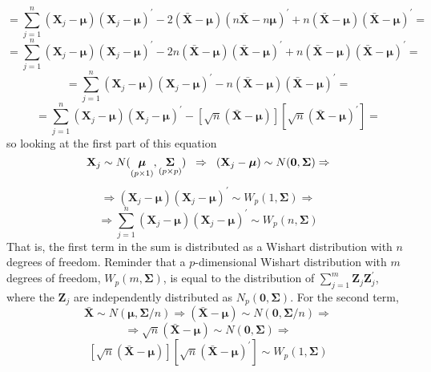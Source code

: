 \documentclass{article}
\begin{document}
    \[
        =
        \scriptstyle{
        \sum_{j=1}^{n}{
            (\textbf{X}_{j} - \bm{\mu}){(\textbf{X}_{j} - \bm{\mu})}^{\prime}
        }
        -
        2
        (\bar{\textbf{X}} - \bm{\mu})
        {(n\bar{\textbf{X}} - n\bm{\mu})}^{\prime}
        +
        n
        (\bar{\textbf{X}} - \bm{\mu}){(\bar{\textbf{X}} - \bm{\mu})}^{\prime}
        }
        =
    \]
    \[
        =
        \scriptstyle{
        \sum_{j=1}^{n}{
            (\textbf{X}_{j} - \bm{\mu}){(\textbf{X}_{j} - \bm{\mu})}^{\prime}
        }
        -
        2n
        (\bar{\textbf{X}} - \bm{\mu})
        {(\bar{\textbf{X}} - \bm{\mu})}^{\prime}
        +
        n
        (\bar{\textbf{X}} - \bm{\mu}){(\bar{\textbf{X}} - \bm{\mu})}^{\prime}
        }
        =
    \]
    \[
        =
        \sum_{j=1}^{n}{
            (\textbf{X}_{j} - \bm{\mu}){(\textbf{X}_{j} - \bm{\mu})}^{\prime}
        }
        -
        n
        (\bar{\textbf{X}} - \bm{\mu})
        {(\bar{\textbf{X}} - \bm{\mu})}^{\prime}
        =
    \]
    \[
        =
        \sum_{j=1}^{n}{
            (\textbf{X}_{j} - \bm{\mu}){(\textbf{X}_{j} - \bm{\mu})}^{\prime}
        }
        -
        \left[
            \sqrt{n}
            (\bar{\textbf{X}} - \bm{\mu})
        \right]
        \left[
            \sqrt{n}
            {(\bar{\textbf{X}} - \bm{\mu})}^{\prime}
        \right]
        =
    \]
    so looking at the first part of this equation
    \[
        \textbf{X}_{j}
        \sim
        N(\underset{(p \times 1)}{\bm{\mu}}, \underset{(p \times p)}{\bm{\Sigma}})
        \hspace{0.2cm}
        \Rightarrow
        \hspace{0.2cm}
        (\textbf{X}_{j} - \bm{\mu})
        \sim
        N(\textbf{0}, \bm{\Sigma})
        \Rightarrow
    \]
    \[
        \Rightarrow
        (\textbf{X}_{j} - \bm{\mu}){(\textbf{X}_{j} - \bm{\mu})}^{\prime}
        \sim
        W_{p}(1, \bm{\Sigma})
        \Rightarrow
    \]
    \[
        \Rightarrow
        \sum_{j=1}^{n}{
            (\textbf{X}_{j} - \bm{\mu}){(\textbf{X}_{j} - \bm{\mu})}^{\prime}
        }
        \sim
        W_{p}(n, \bm{\Sigma})
    \]
    That is, the first term in the sum is distributed as a Wishart distribution with $n$ degrees of freedom. Reminder that a $p$-dimensional Wishart distribution with $m$ degrees of freedom, $W_{p}(m, \bm{\Sigma})$, is equal to the distribution of $\sum_{j=1}^{m}\textbf{Z}_{j}\textbf{Z}_{j}^{\prime}$, where the $\textbf{Z}_{j}$ are independently distributed as $N_{p}(\textbf{0}, \bm{\Sigma})$. For the second term,
    \[
        \bar{\textbf{X}}
        \sim
        N(\bm{\mu}, \bm{\Sigma}/n)
        \Rightarrow
        (\bar{\textbf{X}} - \bm{\mu})
        \sim
        N(\textbf{0}, \bm{\Sigma}/n)
        \Rightarrow
    \]
    \[
        \Rightarrow
        \sqrt{n}
        (\bar{\textbf{X}} - \bm{\mu})
        \sim
        N(\textbf{0}, \bm{\Sigma})
        \Rightarrow
    \]
    \[
        \left[
            \sqrt{n}
            (\bar{\textbf{X}} - \bm{\mu})
        \right]
        \left[
            \sqrt{n}
            {(\bar{\textbf{X}} - \bm{\mu})}^{\prime}
        \right]
        \sim
        W_{p}(1, \bm{\Sigma})
    \]
\end{document}
